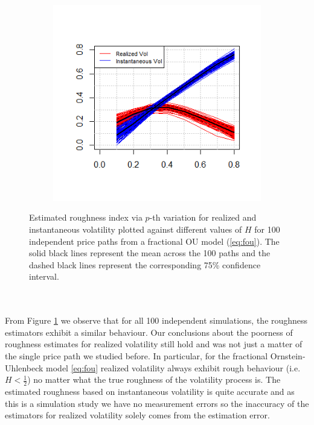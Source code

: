 \documentclass{article}
\begin{document}
\begin{figure}[htbp]
    \centering
    
    \begin{subfigure}{0.78\textwidth}
        \includegraphics[width=\linewidth]{ex7_plot100.png}
    \end{subfigure}
    
    \caption{Estimated roughness index via $p$-th variation for realized and instantaneous volatility plotted against different values of $H$ for 100 independent price paths from a fractional OU model (\ref{eq:fou}). The solid black lines represent the mean across the 100 paths and the dashed black lines represent the corresponding 75\% confidence interval.}
    \label{fig:ex7plot100}
\end{figure}\\\\
From Figure \ref{fig:ex7plot100} we observe that for all 100 independent simulations, the roughness estimators exhibit a similar behaviour. Our conclusions about the poorness of roughness estimates for realized volatility still hold and was not just a matter of the single price path we studied before. In particular, for the fractional Ornstein-Uhlenbeck model \eqref{eq:fou} realized volatility always exhibit rough behaviour (i.e. $H<\frac{1}{2}$) no matter what the true roughness of the volatility process is. The estimated roughness based on instantaneous volatility is quite accurate and as this is a simulation study we have no measurement errors so the inaccuracy of the estimators for realized volatility solely comes from the estimation error. \\\\
\end{document}
